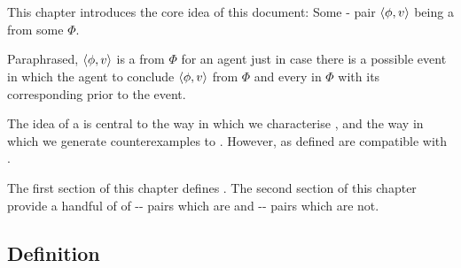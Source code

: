 \chapter{}
\label{cha:fcs}

\nocite{Ryle:1946tu}

\begin{note}
  This chapter introduces the core idea of this document:
  Some - pair \(\langle \phi, v \rangle\) being a \emph{\fc{}} from some  \(\Phi\).

  Paraphrased, \(\langle \phi, v \rangle\) is a \fc{} from \(\Phi\) for an agent just in case there is a possible event in which the agent to conclude \(\langle \phi, v \rangle\) from \(\Phi\) and \evals{} every \prop{} in \(\Phi\) with its corresponding \val{} prior to the event.
\end{note}

\begin{note}
  The idea of a  is central to the way in which we characterise , and the way in which we generate counterexamples to \issueInclusion{}.
  However,  as defined are compatible with \issueInclusion{}.
\end{note}

\begin{note}
  The first section of this chapter defines .
  The second section of this chapter provide a handful of  of -- pairs which are  and -- pairs which are not.
\end{note}

\section{Definition}
\label{cha:fcs:def}

